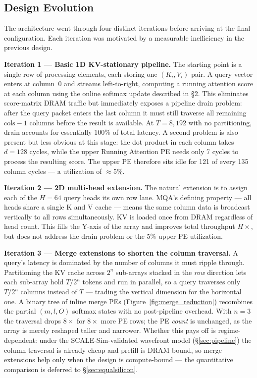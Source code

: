 \documentclass[11pt]{article}
\begin{document}
\subsection{Design Evolution}

The architecture went through four distinct iterations before
arriving at the final configuration.
Each iteration was motivated by a measurable inefficiency in
the previous design.

\textbf{Iteration 1 --- Basic 1D KV-stationary pipeline.}
The starting point is a single row of processing elements,
each storing one \((K_i, V_i)\) pair.
A query vector enters at column~0 and streams left-to-right,
computing a running attention score at each column using the
online softmax update described in \S2.
This eliminates score-matrix DRAM traffic but immediately
exposes a pipeline drain problem: after the query packet enters
the last column it must still traverse all remaining
\(\text{cols} - 1\) columns before the result is available.
At \(T = 8{,}192\) with no partitioning, drain accounts for
essentially 100\% of total latency.
A second problem is also present but less obvious at this stage:
the dot product in each column takes \(d = 128\) cycles,
while the upper Running Attention PE needs only 7 cycles to
process the resulting score.
The upper PE therefore sits idle for 121 of every 135 column
cycles --- a utilization of \(\approx\)5\%.

\textbf{Iteration 2 --- 2D multi-head extension.}
The natural extension is to assign each of the \(H = 64\)
query heads its own row lane.
MQA's defining property --- all heads share a single K and V
cache --- means the same column data is broadcast vertically
to all rows simultaneously.
KV is loaded once from DRAM regardless of head count.
This fills the Y-axis of the array and improves total throughput
\(H\times\), but does not address the drain problem or the
5\% upper PE utilization.

\textbf{Iteration 3 --- Merge extensions to shorten the column traversal.}
A query's latency is dominated by the number of columns it must
ripple through. Partitioning the KV cache across \(2^n\) sub-arrays
stacked in the \emph{row} direction lets each sub-array hold
\(T / 2^n\) tokens and run in parallel, so a query traverses only
\(T / 2^n\) columns instead of \(T\) --- trading the vertical dimension
for the horizontal one.
A binary tree of inline merge PEs (Figure~\ref{fig:merge_reduction})
recombines the partial \((m, l, O)\) softmax states with no
post-pipeline overhead.
With \(n = 3\) the traversal drops \(8\times\) for \(8\times\) more PE
rows; the PE \emph{count} is unchanged, as the array is merely reshaped
taller and narrower.
Whether this pays off is regime-dependent: under the SCALE-Sim-validated
wavefront model (\S\ref{sec:pipeline}) the column traversal is already
cheap and prefill is DRAM-bound, so merge extensions help only when the
design is compute-bound --- the quantitative comparison is deferred to
\S\ref{sec:equalsilicon}.
\end{document}
